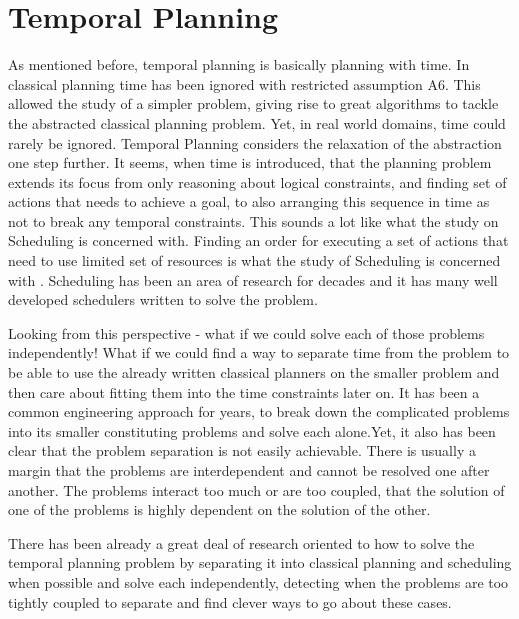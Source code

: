 \documentclass
[a4paper
,english
,parskip=half
,bibliography=totoc
]{scrreprt}
\begin{document}
\chapter{Temporal Planning} \label{temporal_planning}
    
    As mentioned before, temporal planning is basically planning with time. In classical planning time has been ignored with restricted assumption A6. This allowed the study of a simpler problem, giving rise to great algorithms to tackle the abstracted classical planning problem. Yet, in real world domains, time could rarely be ignored. Temporal Planning considers the relaxation of the abstraction one step further. 
    It seems, when time is introduced, that the planning problem extends its focus from only reasoning about logical constraints, and finding set of actions that needs to achieve a goal, to also arranging this sequence in time as not to break any temporal constraints. This sounds a lot like what the study on Scheduling is concerned with. Finding an order for executing a set of actions that need to use limited set of resources is what the study of Scheduling is concerned with \citep{automated_planning}. Scheduling has been an area of research for decades and it has many well developed schedulers written to solve the problem.

    Looking from this perspective - what if we could solve each of those problems independently! What if we could find a way to separate time from the problem to be able to use the already written classical planners on the smaller problem and then care about fitting them into the time constraints later on. It has been a common engineering approach for years, to break down the complicated problems into its smaller constituting problems and solve each alone.Yet, it also has been clear that the problem separation is not easily achievable. There is usually a margin that the problems are interdependent and cannot be resolved one after another. The problems interact too much or are too coupled, that the solution of one of the problems is highly dependent on the solution of the other.

    There has been already a great deal of research oriented to how to solve the temporal planning problem by separating it into classical planning and scheduling when possible and solve each independently, detecting when the problems are too tightly coupled to separate and find clever ways to go about these cases.
\end{document}
